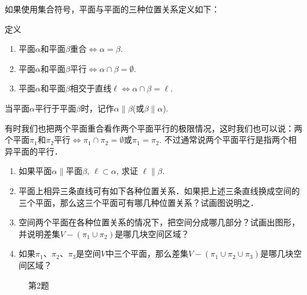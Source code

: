 如果使用集合符号，平面与平面的三种位置关系定义如下：

\begin{blk}{定义}
\begin{enumerate}
\item 平面$\alpha$和平面$\beta$重合$\Longleftrightarrow \alpha=\beta$.
\item 平面$\alpha$和平面$\beta$平行$\Longleftrightarrow \alpha\cap \beta=\emptyset$.
\item 平面$\alpha$和平面$\beta$相交于直线$\ell \Longleftrightarrow \alpha\cap \beta=\ell$.
\end{enumerate}
\end{blk}

当平面$\alpha$平行于平面$\beta$时，记作$\alpha\parallel \beta$(或$\beta\parallel \alpha$).

有时我们也把两个平面重合看作两个平面平行的极限情况，这时我们也可以说：两个平面$\pi_1$和$\pi_2$平行$\Longleftrightarrow \pi_1\cap \pi_2=\emptyset$或$\pi_1=\pi_2$. 不过通常说两个平面平行是指两个相异平面的平行．

\begin{ex}
\begin{enumerate}
  \item 如果平面$\alpha\parallel$平面$\beta$, $\ell\subset \alpha$, 求证 $\ell\parallel \beta$.
  \item 平面上相异三条直线可有如下各种位置关系．如果把上述三条直线换成空间的三个平面，那么这三个平面可有哪几种位置关系？试画图说明之．
  \item 空间两个平面在各种位置关系的情况下，把空间分成哪几部分？试画出图形，并说明差集$V-(\pi_1\cup \pi_2)$是哪几块空间区域？
  \item 如果$\pi_1$、$\pi_2$、$\pi_3$是空间$V$中三个平面，那么差集$V-(\pi_1\cup \pi_2\cup \pi_3)$是哪几块空间区域？
\end{enumerate}
\end{ex}

\begin{figure}[htp]
  \centering
{}
  \caption*{第2题}
\end{figure}

